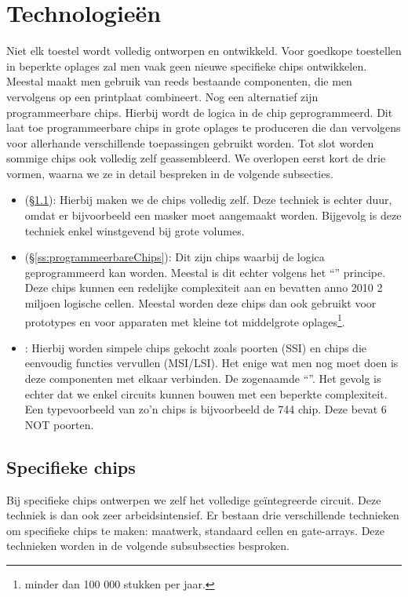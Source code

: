 \section{Technologie\"en}
Niet elk toestel wordt volledig ontworpen en ontwikkeld. Voor goedkope toestellen in beperkte oplages zal men vaak geen nieuwe specifieke chips ontwikkelen. Meestal maakt men gebruik van reeds bestaande componenten, die men vervolgens op een printplaat combineert. Nog een alternatief zijn programmeerbare chips. Hierbij wordt de logica in de chip geprogrammeerd. Dit laat toe programmeerbare chips in grote oplages te produceren die dan vervolgens voor allerhande verschillende toepassingen gebruikt worden. Tot slot worden sommige chips ook volledig zelf geassembleerd. We overlopen eerst kort de drie vormen, waarna we ze in detail bespreken in de volgende subsecties.
\begin{itemize}
 \item {} (\S\ref{ss:specifiekeChips}): Hierbij maken we de chips volledig zelf. Deze techniek is echter duur, omdat er bijvoorbeeld een masker moet aangemaakt worden. Bijgevolg is deze techniek enkel winstgevend bij grote volumes.
 \item {} (\S\ref{ss:programmeerbareChips}): Dit zijn chips waarbij de logica geprogrammeerd kan worden. Meestal is dit echter volgens het ``'' principe. Deze chips kunnen een redelijke complexiteit aan en bevatten anno 2010 2 miljoen logische cellen. Meestal worden deze chips dan ook gebruikt voor prototypes en voor apparaten met kleine tot middelgrote oplages\footnote{minder dan 100 000 stukken per jaar.}.
 \item {}: Hierbij worden simpele chips gekocht zoals poorten (SSI) en chips die eenvoudig functies vervullen (MSI/LSI). Het enige wat men nog moet doen is deze componenten met elkaar verbinden. De zogenaamde ``''. Het gevolg is echter dat we enkel circuits kunnen bouwen met een beperkte complexiteit. Een typevoorbeeld van zo'n chips is bijvoorbeeld de 744 chip. Deze bevat 6 NOT poorten.
\end{itemize}
\subsection{Specifieke chips}
\label{ss:specifiekeChips}
Bij specifieke chips ontwerpen we zelf het volledige ge\"integreerde circuit. Deze techniek is dan ook zeer arbeidsintensief. Er bestaan drie verschillende technieken om specifieke chips te maken: maatwerk, standaard cellen en gate-arrays. Deze technieken worden in de volgende subsubsecties besproken.
